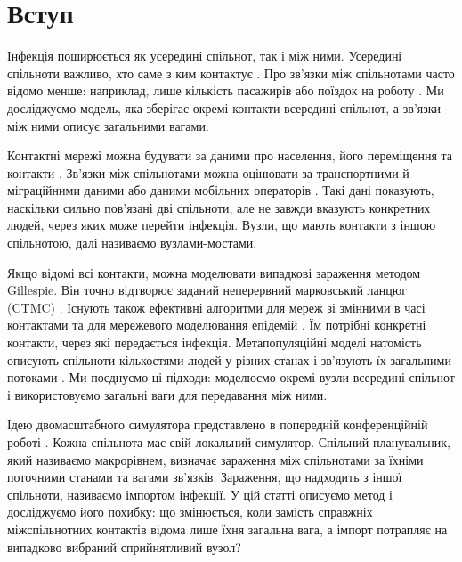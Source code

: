 ﻿%
\begingroup\color{black}
\hypersetup{citecolor=black,linkcolor=black}

\section{Вступ}
\label{sec:introduction}

Інфекція поширюється як усередині спільнот, так і між ними. Усередині спільноти важливо, хто саме з ким контактує \citep{keeling2005,pastorsatorras2015,kiss2017}. Про зв'язки між спільнотами часто відомо менше: наприклад, лише кількість пасажирів або поїздок на роботу \citep{balcan2009,barbosa2018human}. Ми досліджуємо модель, яка зберігає окремі контакти всередині спільнот, а зв'язки між ними описує загальними вагами.

Контактні мережі можна будувати за даними про населення, його переміщення та контакти \citep{eubank2004,danon2011}. Зв'язки між спільнотами можна оцінювати за транспортними й міграційними даними або даними мобільних операторів \citep{barbosa2018human,chang2021}. Такі дані показують, наскільки сильно пов'язані дві спільноти, але не завжди вказують конкретних людей, через яких може перейти інфекція. Вузли, що мають контакти з іншою спільнотою, далі називаємо вузлами-мостами.

Якщо відомі всі контакти, можна моделювати випадкові зараження методом Gillespie. Він точно відтворює заданий неперервний марковський ланцюг (CTMC) \citep{gillespie1977exact,gibson2000}. Існують також ефективні алгоритми для мереж зі змінними в часі контактами та для мережевого моделювання епідемій \citep{vestergaard2015,kuryliak2025simulating}. Їм потрібні конкретні контакти, через які передається інфекція. Метапопуляційні моделі натомість описують спільноти кількостями людей у різних станах і зв'язують їх загальними потоками \citep{colizza2007reaction,colizza2008,balcan2010modeling,ajelli2010}. Ми поєднуємо ці підходи: моделюємо окремі вузли всередині спільнот і використовуємо загальні ваги для передавання між ними.

Ідею двомасштабного симулятора представлено в попередній конференційній роботі \citep{kuryliak2025towards}. Кожна спільнота має свій локальний симулятор. Спільний планувальник, який називаємо макрорівнем, визначає зараження між спільнотами за їхніми поточними станами та вагами зв'язків. Зараження, що надходить з іншої спільноти, називаємо імпортом інфекції. У цій статті описуємо метод і досліджуємо його похибку: що змінюється, коли замість справжніх міжспільнотних контактів відома лише їхня загальна вага, а імпорт потрапляє на випадково вибраний сприйнятливий вузол?

